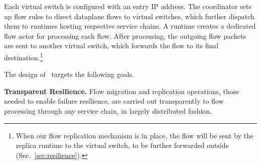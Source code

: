 Each virtual switch is configured with an entry IP address. The coordinator sets up flow rules to direct dataplane flows to virtual switches, which further dispatch them to runtimes hosting respective service chains. A runtime creates a dedicated flow actor for processing each flow. After processing, the outgoing flow packets are sent to another virtual switch,
which forwards the flow to its final destination.\footnote{When our flow replication mechanism is in place, the flow will be sent by the replica runtime to the virtual switch, to be further forwarded outside (Sec.~\ref{sec:resilience}).}







The design of \nfactor~targets the following goals. %

{\bf Transparent Resilience.}  Flow migration and replication operations, those needed to enable failure resilience, are carried out transparently to flow processing through any service chain, in largely distributed fashion.

